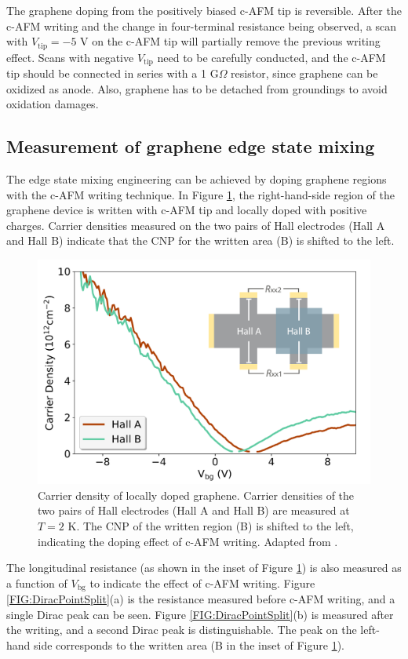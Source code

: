 \documentclass[pdflatex, sectionletters, 12pt]{pittetd}    %
\begin{document}
The graphene doping from the positively biased c-AFM tip is reversible. After the c-AFM writing and the change in four-terminal resistance being observed, a scan with $V_\mathrm{tip}= -5$ V on the c-AFM tip will partially remove the previous writing effect. Scans with negative $V_\mathrm{tip}$ need to be carefully conducted, and the c-AFM tip should be connected in series with a 1 G$\Omega$ resistor, since graphene can be oxidized as anode\cite{alaboson2011conductive, byun2011nanoscale}. Also, graphene has to be detached from groundings to avoid oxidation damages\cite{alaboson2011conductive}. 

\subsection{Measurement of graphene edge state mixing}

The edge state mixing engineering can be achieved by doping graphene regions with the c-AFM writing technique. In Figure \ref{FIG:GrapheneDopedHall}, the right-hand-side region of the graphene device is written with c-AFM tip and locally doped with positive charges. Carrier densities measured on the two pairs of Hall electrodes (Hall A and Hall B) indicate that the CNP for the written area (B) is shifted to the left.
\\

\begin{figure}[h!]
	\centering
	\includegraphics[width=.7\textwidth]{Drawing/GrapheneDopedHall.pdf}
	\caption{Carrier density of locally doped graphene. Carrier densities of the two pairs of Hall electrodes (Hall A and Hall B) are measured at $T = 2$ K. The CNP of the written region (B) is shifted to the left, indicating the doping effect of c-AFM writing. Adapted from \cite{li2019reconfigurable}.}
	\label{FIG:GrapheneDopedHall}	
\end{figure}

The longitudinal resistance (as shown in the inset of Figure \ref{FIG:GrapheneDopedHall}) is also measured as a function of $V_\mathrm{bg}$ to indicate the effect of c-AFM writing. Figure \ref{FIG:DiracPointSplit}(a) is the resistance measured before c-AFM writing, and a single Dirac peak can be seen. Figure \ref{FIG:DiracPointSplit}(b) is measured after the writing, and a second Dirac peak is distinguishable. The peak on the left-hand side corresponds to the written area (B in the inset of Figure \ref{FIG:GrapheneDopedHall}).
\\
\end{document}
